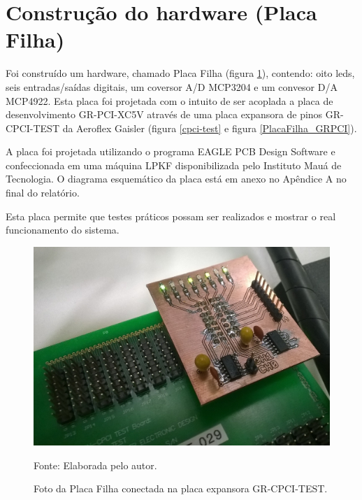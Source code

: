 
\vfill

\section{Construção do hardware (Placa Filha)}

Foi construído um hardware, chamado Placa Filha (figura \ref{PlacaFilha}), contendo: oito leds, seis entradas/saídas digitais, um coversor A/D MCP3204 e um convesor D/A MCP4922. Esta placa foi projetada com o intuito de ser acoplada a placa de desenvolvimento GR-PCI-XC5V através de uma placa expansora de pinos GR-CPCI-TEST da Aeroflex Gaisler (figura \ref{cpci-test} e figura \ref{PlacaFilha_GRPCI}).

A placa foi projetada utilizando o programa EAGLE PCB Design Software e confeccionada em uma máquina LPKF disponibilizada pelo Instituto Mauá de Tecnologia. O diagrama esquemático da placa está em anexo no Apêndice A no final do relatório.

Esta placa permite que testes práticos possam ser realizados e mostrar o real funcionamento do sistema.

\begin{figure}[!htb]
	\centering
	\caption{Foto da Placa Filha conectada na placa expansora GR-CPCI-TEST.}
	\includegraphics[scale = .4]{Imagens/PlacaFilha}
	
	Fonte: Elaborada pelo autor.
	
	\label{PlacaFilha}
\end{figure}


